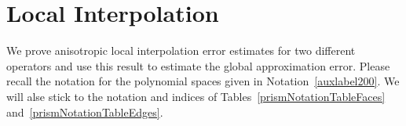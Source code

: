 \chapter{Local Interpolation}
We prove anisotropic local interpolation error estimates for two different operators
and use this result to estimate the global approximation error. Please recall 
the notation for the polynomial spaces given in Notation~\ref{auxlabel200}. We 
will alse stick to the notation and indices of Tables~\ref{prismNotationTableFaces}
and~\ref{prismNotationTableEdges}.





